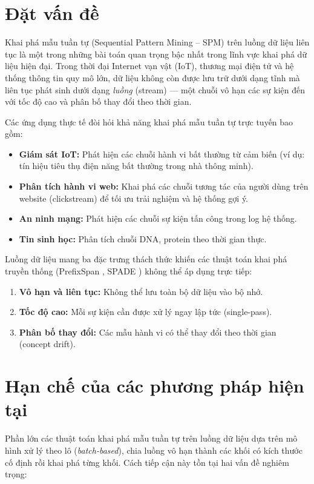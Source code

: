 \documentclass[a4paper,12pt]{report}
\begin{document}
\section{Đặt vấn đề}
Khai phá mẫu tuần tự (Sequential Pattern Mining -- SPM) trên luồng dữ liệu liên tục là một trong những bài toán quan trọng bậc nhất trong lĩnh vực khai phá dữ liệu hiện đại. Trong thời đại Internet vạn vật (IoT), thương mại điện tử và hệ thống thông tin quy mô lớn, dữ liệu không còn được lưu trữ dưới dạng tĩnh mà liên tục phát sinh dưới dạng \textit{luồng} (stream) --- một chuỗi vô hạn các sự kiện đến với tốc độ cao và phân bố thay đổi theo thời gian.

Các ứng dụng thực tế đòi hỏi khả năng khai phá mẫu tuần tự trực tuyến bao gồm:
\begin{itemize}
    \item \textbf{Giám sát IoT:} Phát hiện các chuỗi hành vi bất thường từ cảm biến (ví dụ: tín hiệu tiêu thụ điện năng bất thường trong nhà thông minh).
    \item \textbf{Phân tích hành vi web:} Khai phá các chuỗi tương tác của người dùng trên website (clickstream) để tối ưu trải nghiệm và hệ thống gợi ý.
    \item \textbf{An ninh mạng:} Phát hiện các chuỗi sự kiện tấn công trong log hệ thống.
    \item \textbf{Tin sinh học:} Phân tích chuỗi DNA, protein theo thời gian thực.
\end{itemize}

Luồng dữ liệu mang ba đặc trưng thách thức khiến các thuật toán khai phá truyền thống (PrefixSpan \cite{pei2001}, SPADE \cite{zaki2001}) không thể áp dụng trực tiếp:
\begin{enumerate}
    \item \textbf{Vô hạn và liên tục:} Không thể lưu toàn bộ dữ liệu vào bộ nhớ.
    \item \textbf{Tốc độ cao:} Mỗi sự kiện cần được xử lý ngay lập tức (single-pass).
    \item \textbf{Phân bố thay đổi:} Các mẫu hành vi có thể thay đổi theo thời gian (concept drift).
\end{enumerate}

\section{Hạn chế của các phương pháp hiện tại}
Phần lớn các thuật toán khai phá mẫu tuần tự trên luồng dữ liệu dựa trên mô hình xử lý theo lô (\textit{batch-based}), chia luồng vô hạn thành các khối có kích thước cố định rồi khai phá từng khối. Cách tiếp cận này tồn tại hai vấn đề nghiêm trọng:
\end{document}
